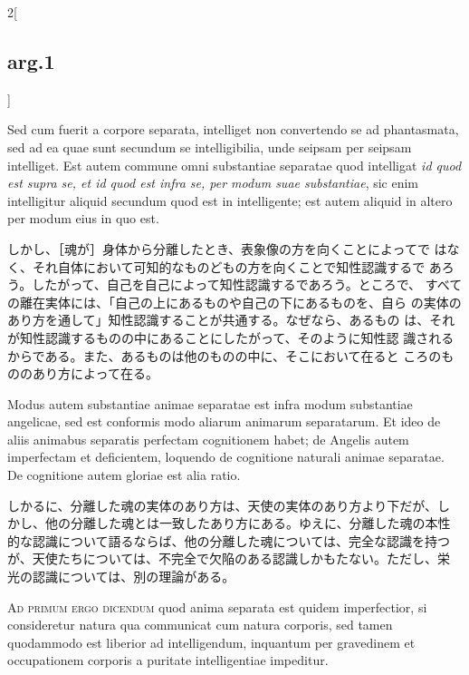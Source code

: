 \documentclass[paper=a4paper,fontsize=10pt,jafontsize=9pt,titlepage]{jlreq}
\begin{document}
\begin{paracol}{2}[\subsection{arg.1}]
\switchcolumn*

Sed cum fuerit a corpore separata, intelliget non convertendo se ad
phantasmata, sed ad ea quae sunt secundum se intelligibilia, unde
seipsam per seipsam intelliget. Est autem commune omni substantiae
separatae quod intelligat {\itshape id quod est supra se, et id quod est
infra se, per modum suae substantiae}, sic enim intelligitur aliquid
secundum quod est in intelligente; est autem aliquid in altero per
modum eius in quo est.

\switchcolumn

しかし、［魂が］身体から分離したとき、表象像の方を向くことによってで
はなく、それ自体において可知的なものどもの方を向くことで知性認識するで
あろう。したがって、自己を自己によって知性認識するであろう。ところで、
すべての離在実体には、「自己の上にあるものや自己の下にあるものを、自ら
の実体のあり方を通して」知性認識することが共通する。なぜなら、あるもの
は、それが知性認識するものの中にあることにしたがって、そのように知性認
識されるからである。また、あるものは他のものの中に、そこにおいて在ると
ころのもののあり方によって在る。

\switchcolumn*

Modus autem substantiae animae separatae est infra modum substantiae
angelicae, sed est conformis modo aliarum animarum separatarum. Et
ideo de aliis animabus separatis perfectam cognitionem habet; de
Angelis autem imperfectam et deficientem, loquendo de cognitione
naturali animae separatae. De cognitione autem gloriae est alia ratio.

\switchcolumn

しかるに、分離した魂の実体のあり方は、天使の実体のあり方より下だが、し
かし、他の分離した魂とは一致したあり方にある。ゆえに、分離した魂の本性
的な認識について語るならば、他の分離した魂については、完全な認識を持つ
が、天使たちについては、不完全で欠陥のある認識しかもたない。ただし、栄
光の認識については、別の理論がある。

\switchcolumn*[\subsection{ad.1}]

{\scshape Ad primum ergo dicendum} quod anima separata est quidem
imperfectior, si consideretur natura qua communicat cum natura
corporis, sed tamen quodammodo est liberior ad intelligendum,
inquantum per gravedinem et occupationem corporis a puritate
intelligentiae impeditur.

\switchcolumn


\end{paracol}
\end{document}
